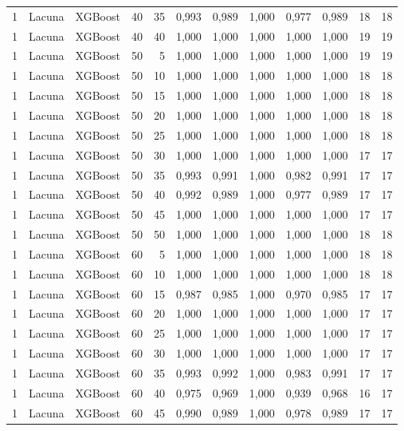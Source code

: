 \begin{longtable}{@{}rllrrrrrrrrr@{}}
1 & Lacuna & XGBoost & 40 & 35 & 0,993 & 0,989 & 1,000 & 0,977 & 0,989 & 18 & 18 \\
1 & Lacuna & XGBoost & 40 & 40 & 1,000 & 1,000 & 1,000 & 1,000 & 1,000 & 19 & 19 \\
1 & Lacuna & XGBoost & 50 & 5 & 1,000 & 1,000 & 1,000 & 1,000 & 1,000 & 19 & 19 \\
1 & Lacuna & XGBoost & 50 & 10 & 1,000 & 1,000 & 1,000 & 1,000 & 1,000 & 18 & 18 \\
1 & Lacuna & XGBoost & 50 & 15 & 1,000 & 1,000 & 1,000 & 1,000 & 1,000 & 18 & 18 \\
1 & Lacuna & XGBoost & 50 & 20 & 1,000 & 1,000 & 1,000 & 1,000 & 1,000 & 18 & 18 \\
1 & Lacuna & XGBoost & 50 & 25 & 1,000 & 1,000 & 1,000 & 1,000 & 1,000 & 18 & 18 \\
1 & Lacuna & XGBoost & 50 & 30 & 1,000 & 1,000 & 1,000 & 1,000 & 1,000 & 17 & 17 \\
1 & Lacuna & XGBoost & 50 & 35 & 0,993 & 0,991 & 1,000 & 0,982 & 0,991 & 17 & 17 \\
1 & Lacuna & XGBoost & 50 & 40 & 0,992 & 0,989 & 1,000 & 0,977 & 0,989 & 17 & 17 \\
1 & Lacuna & XGBoost & 50 & 45 & 1,000 & 1,000 & 1,000 & 1,000 & 1,000 & 17 & 17 \\
1 & Lacuna & XGBoost & 50 & 50 & 1,000 & 1,000 & 1,000 & 1,000 & 1,000 & 18 & 18 \\
1 & Lacuna & XGBoost & 60 & 5 & 1,000 & 1,000 & 1,000 & 1,000 & 1,000 & 18 & 18 \\
1 & Lacuna & XGBoost & 60 & 10 & 1,000 & 1,000 & 1,000 & 1,000 & 1,000 & 18 & 18 \\
1 & Lacuna & XGBoost & 60 & 15 & 0,987 & 0,985 & 1,000 & 0,970 & 0,985 & 17 & 17 \\
1 & Lacuna & XGBoost & 60 & 20 & 1,000 & 1,000 & 1,000 & 1,000 & 1,000 & 17 & 17 \\
1 & Lacuna & XGBoost & 60 & 25 & 1,000 & 1,000 & 1,000 & 1,000 & 1,000 & 17 & 17 \\
1 & Lacuna & XGBoost & 60 & 30 & 1,000 & 1,000 & 1,000 & 1,000 & 1,000 & 17 & 17 \\
1 & Lacuna & XGBoost & 60 & 35 & 0,993 & 0,992 & 1,000 & 0,983 & 0,991 & 17 & 17 \\
1 & Lacuna & XGBoost & 60 & 40 & 0,975 & 0,969 & 1,000 & 0,939 & 0,968 & 16 & 17 \\
1 & Lacuna & XGBoost & 60 & 45 & 0,990 & 0,989 & 1,000 & 0,978 & 0,989 & 17 & 17 \\

\end{longtable}
